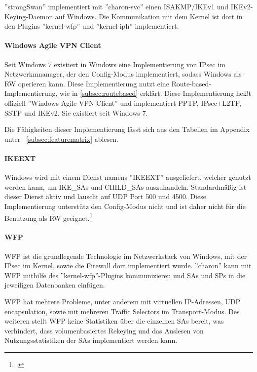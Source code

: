 ''strongSwan'' implementiert mit ''charon-svc'' einen \ac{ISAKMP}/IKEv1 und IKEv2-Keying-Daemon
auf Windows. Die Kommunikation mit dem Kernel ist dort in den Plugins ''kernel-wfp''
und ''kernel-iph'' implementiert.

\paragraph{Windows Agile VPN Client}
Seit Windows 7 existiert in Windows eine Implementierung von \ac{IPsec} im Netzwerkmnanager,
der den Config-Modus implementiert, sodass Windows als \ac{RW} operieren kann.
Diese Implementierung nutzt eine Route-based-Implementierung, wie in \autoref{subsec:routebased}
erklärt. Diese Implementierung heißt offiziell ''Windows Agile VPN Client'' und
implementiert \ac{PPTP}, \ac{IPsec}+\ac{L2TP}, \ac{SSTP} und \ac{IKE}v2. Sie existiert seit Windows 7.

Die Fähigkeiten dieser Implementierung lässt sich aus den Tabellen im Appendix unter ~\autoref{subsec:featurematrix} ablesen.


\paragraph{IKEEXT}
Windows wird mit einem Dienst namens ''IKEEXT'' ausgeliefert,
welcher genutzt werden kann, um IKE\_SAs und CHILD\_SAs auszuhandeln. Standardmäßig
ist dieser Dienst aktiv und lauscht auf \ac{UDP} Port 500 und 4500.
Diese Implementierung unterstütz den Config-Modus nicht und ist daher nicht für die Benutzung als \ac{RW} geeignet.\footcite[][]{_ipsec_2016}

\paragraph{WFP}
\ac{WFP} ist die grundlegende Technologie im Netzwerkstack von Windows, mit
der \ac{IPsec} im Kernel, sowie die Firewall dort implementiert wurde.
''charon'' kann mit \ac{WFP} mithilfe des ''kernel-wfp''-Plugins kommunizieren
und \acp{SA} und \acp{SP} in die jeweiligen Datenbanken einfügen.

\ac{WFP} hat mehrere Probleme, unter anderem mit virtuellen IP-Adressen,
UDP encapsulation, sowie mit mehreren Traffic Selectors im Transport-Modus.
Des weiteren stellt \ac{WFP} keine Statistiken über die einzelnen \acp{SA} bereit,
was verhindert, dass volumenbasiertes Rekeying und das Auslesen von Nutzungsstatistiken
der \acp{SA} implementiert werden kann.

